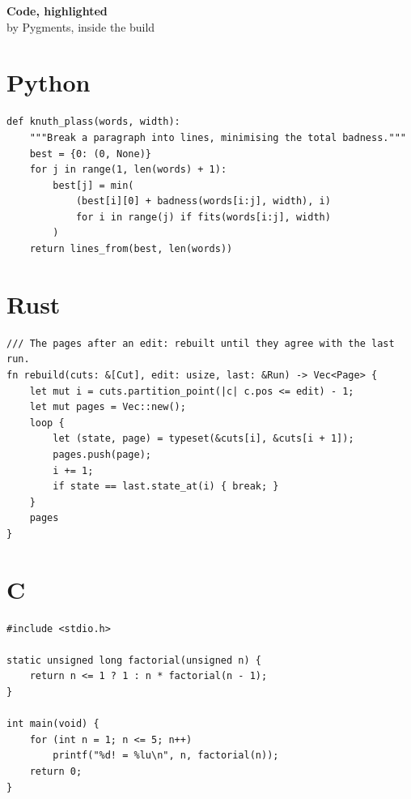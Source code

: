 \documentclass[11pt]{article}
\begin{document}
\begin{center}{\LARGE\bfseries Code, highlighted}\\[3pt]{\large by Pygments, inside the build}\end{center}

\section*{Python}
\begin{verbatim}
def knuth_plass(words, width):
    """Break a paragraph into lines, minimising the total badness."""
    best = {0: (0, None)}
    for j in range(1, len(words) + 1):
        best[j] = min(
            (best[i][0] + badness(words[i:j], width), i)
            for i in range(j) if fits(words[i:j], width)
        )
    return lines_from(best, len(words))
\end{verbatim}

\section*{Rust}
\begin{verbatim}
/// The pages after an edit: rebuilt until they agree with the last run.
fn rebuild(cuts: &[Cut], edit: usize, last: &Run) -> Vec<Page> {
    let mut i = cuts.partition_point(|c| c.pos <= edit) - 1;
    let mut pages = Vec::new();
    loop {
        let (state, page) = typeset(&cuts[i], &cuts[i + 1]);
        pages.push(page);
        i += 1;
        if state == last.state_at(i) { break; }
    }
    pages
}
\end{verbatim}

\section*{C}
\begin{verbatim}
#include <stdio.h>

static unsigned long factorial(unsigned n) {
    return n <= 1 ? 1 : n * factorial(n - 1);
}

int main(void) {
    for (int n = 1; n <= 5; n++)
        printf("%d! = %lu\n", n, factorial(n));
    return 0;
}
\end{verbatim}
\end{document}
